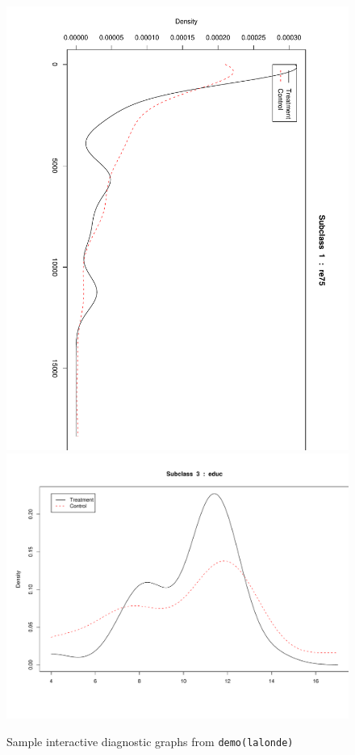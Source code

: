 \documentclass[oneside,letterpaper,titlepage]{article}
\begin{document}
\begin{figure}[tbp]
\begin{center}
    {\includegraphics[scale=0.25,angle=90]{figs/subclass3}}
    {\includegraphics[scale=0.25]{figs/subclass4}}
    \hfill
    \caption{Sample interactive diagnostic graphs from \texttt{demo(lalonde)}}
\label{diags}
\end{center}
\end{figure}
\end{document}
